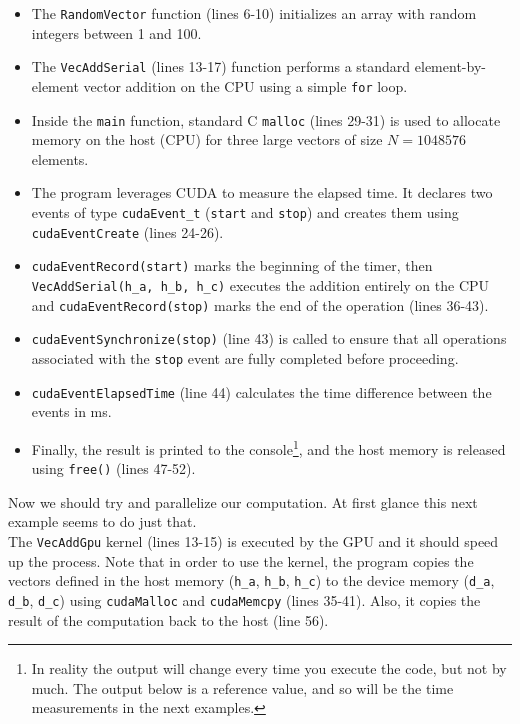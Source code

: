 \begin{itemize}
    \item[-] The \texttt{RandomVector} function (lines 6-10) initializes an array with random integers between 1 and 100. 
    
    \item[-] The \texttt{VecAddSerial} (lines 13-17) function performs a standard element-by-element vector addition on the CPU using a simple \texttt{for} loop.
    
    \item[-] Inside the \texttt{main} function, standard C \texttt{malloc} (lines 29-31) is used to allocate memory on the host (CPU) for three large vectors of size $N = 1048576$ elements.
    
    \item[-] The program leverages CUDA to measure the elapsed time. It declares two events of type \texttt{cudaEvent\_t} (\texttt{start} and \texttt{stop}) and creates them using \texttt{cudaEventCreate} (lines 24-26).
    
    \item[-] \texttt{cudaEventRecord(start)} marks the beginning of the timer, then \texttt{VecAddSerial(h\_a, h\_b, h\_c)} executes the addition entirely on the CPU and \texttt{cudaEventRecord(stop)} marks the end of the operation (lines 36-43).
    
    \item[-] \texttt{cudaEventSynchronize(stop)} (line 43) is called to ensure that all operations associated with the \texttt{stop} event are fully completed before proceeding. 
    
    \item[-] \texttt{cudaEventElapsedTime} (line 44) calculates the time difference between the events in ms. 
    
    \item[-] Finally, the result is printed to the console\footnote{In reality the output will change every time you execute the code, but not by much. The output below is a reference value, and so will be the time measurements in the next examples.}, and the host memory is released using \texttt{free()} (lines 47-52).
\end{itemize}



Now we should try and parallelize our computation. At first glance this next example seems to do just that. \\ The \texttt{VecAddGpu} kernel (lines 13-15) is executed by the GPU and it should speed up the process. Note that in order to use the kernel, the program copies the vectors defined in the host memory (\texttt{h\_a}, \texttt{h\_b}, \texttt{h\_c}) to the device memory (\texttt{d\_a}, \texttt{d\_b}, \texttt{d\_c}) using \texttt{cudaMalloc} and \texttt{cudaMemcpy} (lines 35-41). Also, it copies the result of the computation back to the host (line 56).

